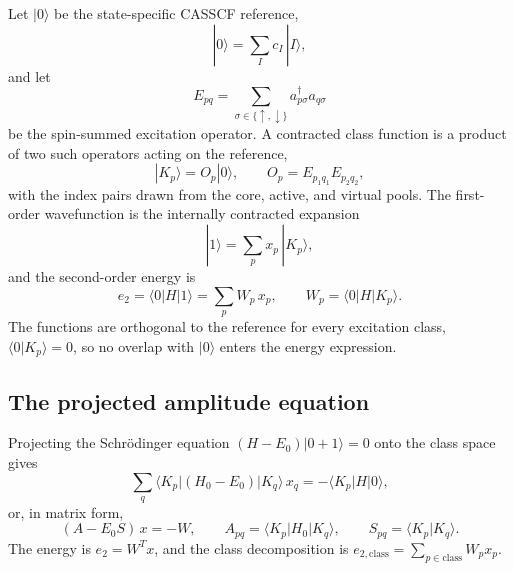 Let $|0\rangle$ be the state-specific CASSCF reference,
\begin{equation}
  |0\rangle = \sum_I c_I\,|I\rangle,
  \label{eq:caspt2-reference}
\end{equation}
and let
\begin{equation}
  E_{pq} = \sum_{\sigma\in\{\uparrow,\downarrow\}}
           a^{\dagger}_{p\sigma}a_{q\sigma}
  \label{eq:caspt2-eoperator}
\end{equation}
be the spin-summed excitation operator.  A contracted class function is
a product of two such operators acting on the reference,
\begin{equation}
  |K_p\rangle = O_p|0\rangle,
  \qquad
  O_p = E_{p_1q_1}E_{p_2q_2},
  \label{eq:caspt2-class-op}
\end{equation}
with the index pairs drawn from the core, active, and virtual pools.
The first-order wavefunction is the internally contracted expansion
\begin{equation}
  |1\rangle = \sum_p x_p\,|K_p\rangle,
  \label{eq:caspt2-first-order}
\end{equation}
and the second-order energy is
\begin{equation}
  e_2 = \langle 0|H|1\rangle
      = \sum_p W_p\,x_p,
  \qquad
  W_p = \langle 0|H|K_p\rangle.
  \label{eq:caspt2-e2}
\end{equation}
The functions are orthogonal to the reference for every excitation
class, $\langle 0|K_p\rangle=0$, so no overlap with $|0\rangle$ enters
the energy expression.

\subsection{The projected amplitude equation}

Projecting the Schrödinger equation $(H-E_0)|0+1\rangle=0$ onto the
class space gives
\begin{equation}
  \sum_q \langle K_p|(H_0-E_0)|K_q\rangle\,x_q
  = -\langle K_p|H|0\rangle,
  \label{eq:caspt2-projected}
\end{equation}
or, in matrix form,
\begin{equation}
  (A-E_0 S)\,x = -W,
  \qquad
  A_{pq}=\langle K_p|H_0|K_q\rangle,
  \qquad
  S_{pq}=\langle K_p|K_q\rangle.
  \label{eq:caspt2-system}
\end{equation}
The energy is $e_2=W^{T}x$, and the class decomposition is
$e_{2,\mathrm{class}}=\sum_{p\in\mathrm{class}}W_p x_p$.

